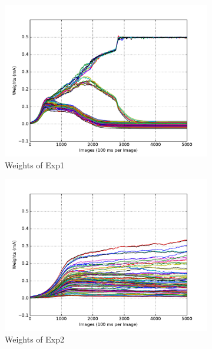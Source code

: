 \begin{figure}
	\centering
	\begin{subfigure}[t]{0.4\textwidth}
		\includegraphics[width=\textwidth]{pics_sdlm/15_exp_SRBM_teach_long/exp1_weights_s.pdf}
		\caption{Weights of Exp1}
	\end{subfigure}
	\begin{subfigure}[t]{0.4\textwidth}
		\includegraphics[width=\textwidth]{pics_sdlm/15_exp_SRBM_teach_long/exp2_weights_s.pdf}
		\caption{Weights of Exp2}
	\end{subfigure}
	\begin{subfigure}[t]{0.4\textwidth}

\end{subfigure}
\end{figure}

